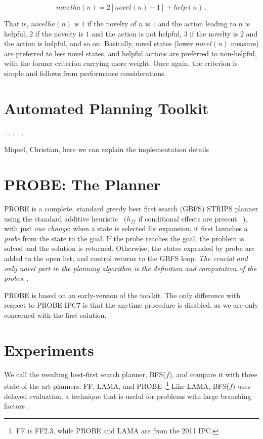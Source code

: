 \documentclass[letterpaper]{article}
\begin{document}
\begin{equation}
novelha(n) = 2 [novel(n)-1] + help(n) \ .
\label{novelha}
\end{equation}

\noindent That is, $novelha(n)$ is $1$ if the novelty of $n$ is $1$
and the action leading to $n$ is helpful, $2$ if the novelty is $1$
and the action is not helpful, $3$ if the novelty is $2$ and the
action is helpful, and so on. Basically, novel states (lower
$novel(n)$ measure) are preferred to less novel states, and helpful
actions are preferred to non-helpful, with the former criterion
carrying more weight.  Once again, the criterion is simple and follows
from performance considerations.



\section{Automated Planning Toolkit}
.
.
.
.
.

Miquel, Christian, here we can explain the implementation details

\section{PROBE: The Planner}

PROBE is a complete, standard greedy best first search (GBFS) STRIPS
planner using the standard {additive heuristic}~\cite{bonet:aij-hsp}
($h_{ff}$ if conditional effects are present ~\cite{hoffmann:ff}),
with just \emph{one change}: when a state is selected for expansion,
it first launches a \emph{probe} from the state to the goal. If the
probe reaches the goal, the problem is solved and the solution is
returned. Otherwise, the states expanded by probe are added to the
open list, and control returns to the GBFS loop.  \emph{The crucial
  and only novel part in the planning algorithm is the definition and
  computation of the probes}~\cite{nir:icaps11}.

PROBE is based on an early-version of the toolkit. The only difference
with respect to PROBE-IPC7 is that the anytime procedure is disabled,
as we are only concerned with the first solution.


\section{Experiments}

We call the resulting best-first search planner, BFS($f$), and compare
it with three state-of-the-art planners: FF, LAMA, and PROBE
\cite{hoffmann:ff,richter:lama,nir:icaps11}.\footnote{FF is FF2.3,
  while PROBE and LAMA are from the 2011 IPC.}  Like LAMA, BFS($f$)
uses delayed evaluation, a technique that is useful for problems with
large branching factors \cite{richter:preferred-ops-and-deferred}.
\end{document}
